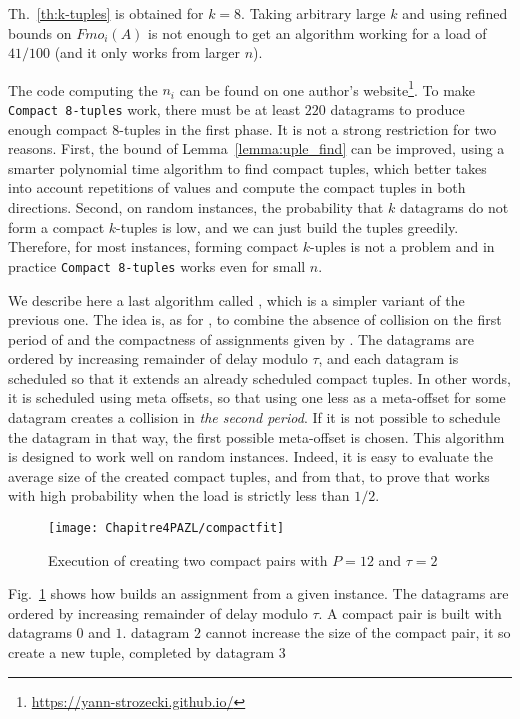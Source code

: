 Th.~\ref{th:k-tuples} is obtained for $k=8$. Taking arbitrary large $k$ and using refined bounds on $Fmo_i(A)$ is not enough to get an algorithm working for a load of $41/100$ (and it only works from larger $n$).

The code computing the $n_i$ can be found on one author's website\footnote{\url{https://yann-strozecki.github.io/}}.
To make \texttt{Compact 8-tuples} work, there must be at least $220$ datagrams to
produce enough compact $8$-tuples in the first phase. It is not a strong restriction for two reasons. First, the bound of Lemma~\ref{lemma:uple_find} can be improved, using a smarter polynomial time algorithm to find compact tuples, which better takes into account repetitions of values and compute the compact tuples in both directions. Second, on random instances, the probability that $k$ datagrams do not form a compact $k$-tuples is low, and we can just build the tuples greedily. Therefore, for most instances, forming compact $k$-uples is not a problem and in practice \texttt{Compact 8-tuples} works even for small $n$.



We describe here a last algorithm called \compactfit, which is a simpler variant of the previous one. The idea is, as for \compactpair, to combine the absence of collision on the first period of \metaoffset and the compactness of assignments given by \firstfit.
The datagrams are ordered by increasing remainder of delay modulo $\tau$, and each datagram is scheduled so that 
it extends an already scheduled compact tuples. In other words, it is scheduled using meta offsets, so that using one less as a meta-offset for some datagram creates a collision in \emph{the second period}. If it is not possible to schedule the datagram in that way, the first possible meta-offset is chosen. This algorithm is designed to work well on random instances. Indeed, it 
is easy to evaluate the average size of the created compact tuples, and from that, to prove that \compactfit works with high probability when the load is strictly less than $1/2$.
\begin{figure}[h]
 \begin{center}
\texttt{[image: Chapitre4PAZL/compactfit]}
\end{center}
\caption{Execution of \compactfit creating two compact pairs with $P=12$ and $\tau =2$}
\label{fig:compactfit}
\end{figure}
Fig.~\ref{fig:compactfit} shows how \compactfit builds an assignment from a given instance. The datagrams are ordered by increasing remainder of delay modulo $\tau$. A compact pair is built with datagrams $0$ and $1$. datagram $2$ cannot increase the size of the compact pair, it so create a new tuple, completed by datagram $3$



